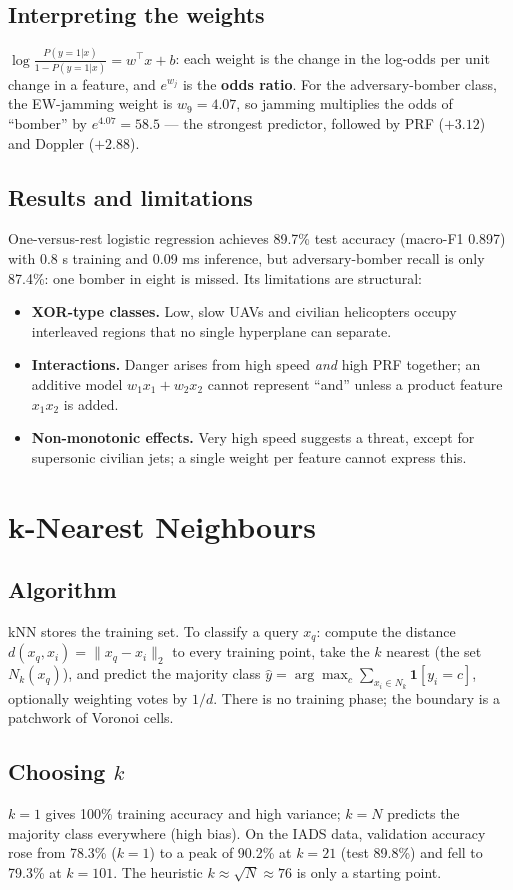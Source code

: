\documentclass[11pt]{article}
\begin{document}
\subsection{Interpreting the weights}
$\log\frac{P(y=1|x)}{1-P(y=1|x)}=w^\top x+b$: each weight is the change in the log-odds per unit change in a feature, and $e^{w_j}$ is the \textbf{odds ratio}. For the adversary-bomber class, the EW-jamming weight is $w_9=4.07$, so jamming multiplies the odds of ``bomber'' by $e^{4.07}=58.5$ --- the strongest predictor, followed by PRF ($+3.12$) and Doppler ($+2.88$).

\subsection{Results and limitations}
One-versus-rest logistic regression achieves 89.7\% test accuracy (macro-F1 0.897) with 0.8 s training and 0.09 ms inference, but adversary-bomber recall is only 87.4\%: one bomber in eight is missed. Its limitations are structural:
\begin{itemize}
\item \textbf{XOR-type classes.} Low, slow UAVs and civilian helicopters occupy interleaved regions that no single hyperplane can separate.
\item \textbf{Interactions.} Danger arises from high speed \emph{and} high PRF together; an additive model $w_1x_1+w_2x_2$ cannot represent ``and'' unless a product feature $x_1x_2$ is added.
\item \textbf{Non-monotonic effects.} Very high speed suggests a threat, except for supersonic civilian jets; a single weight per feature cannot express this.
\end{itemize}

\section{k-Nearest Neighbours}
\subsection{Algorithm}
kNN stores the training set. To classify a query $x_q$: compute the distance $d(x_q,x_i)=\|x_q-x_i\|_2$ to every training point, take the $k$ nearest (the set $N_k(x_q)$), and predict the majority class $\hat y=\arg\max_c\sum_{x_i\in N_k}\mathbf 1[y_i=c]$, optionally weighting votes by $1/d$. There is no training phase; the boundary is a patchwork of Voronoi cells.

\subsection{Choosing $k$}
$k=1$ gives 100\% training accuracy and high variance; $k=N$ predicts the majority class everywhere (high bias). On the IADS data, validation accuracy rose from 78.3\% ($k=1$) to a peak of 90.2\% at $k=21$ (test 89.8\%) and fell to 79.3\% at $k=101$. The heuristic $k\approx\sqrt N\approx76$ is only a starting point.
\end{document}
